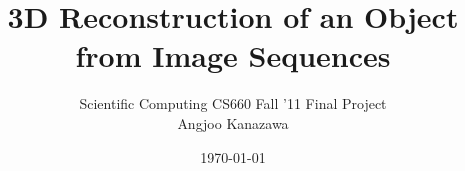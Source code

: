 \newcommand{\sig}{\sigma}
\newcommand{\Sig}{\Sigma}
\newcommand{\eps}{\epsilon}
\newcommand{\del}{\delta}
\newcommand{\ah}{\alpha}
\newcommand{\lam}{\lambda}
\newcommand{\gam}{\gamma}
\newcommand{\kap}{\kappa}
\newcommand{\rarr}{\rightarrow}
\newcommand{\larr}{\leftarrow}
\newcommand{\Rarr}{\Rightarrow}
\newcommand{\Larr}{\Leftarrow}

\newcommand{\ol}{\overline}
\newcommand{\dagg}{\dagger}
\newcommand{\mbb}{\mathbb}
\newcommand{\contra}{\Rightarrow\Leftarrow}
\newcommand{\lc}{\langle} %
\newcommand{\rc}{\rangle} %
\newcommand{\inv}{^{-1}}
\renewcommand{\vec}[1]{\boldsymbol{#1}}
\newcommand{\kth}{^{(k)}}
\newcommand{\cO}{\mathcal{O}}
\newcommand{\grad}{\nabla}
\newcommand{\ddx}{\frac \partial {\partial x}}

\newcommand{\ben}{\begin{enumerate}}
\newcommand{\een}{\end{enumerate}}
\newcommand{\beq}{\begin{quote}}
\newcommand{\enq}{\end{quote}}
\newcommand{\hsone}{\hspace*{1cm}}
\newcommand{\hstwo}{\hspace*{2cm}}

\newcommand{\noi}{\noindent}
\parskip 5pt
\parindent 0pt

\documentclass[a4paper]{article}
\usepackage{amsmath,amssymb,hyperref,graphicx}

\title{3D  Reconstruction of an Object from Image Sequences}
\author{Scientific Computing CS660 Fall '11 Final Project \\ Angjoo Kanazawa}
\date{\today}
\maketitle

\section{Introduction}
Over the last few decades, the influence of Scientific Computing has
been so prevelent in almost every area of Science and Engineering. It has
become a necessary and critical tool for anyone involved in high-level
research in Computer Science. Computer Vision is one of the quintessential example of a research area that heavily builds upon
methods discovered in Scientific Computing, where the primary interest
lies in the analysis and understanding of images which are represented
in numerical matrices. This project explores applications of
computational algorithms explored in Scientific Computing via tackling
the problem of 3D reconstruction of an object from a stream of images.

